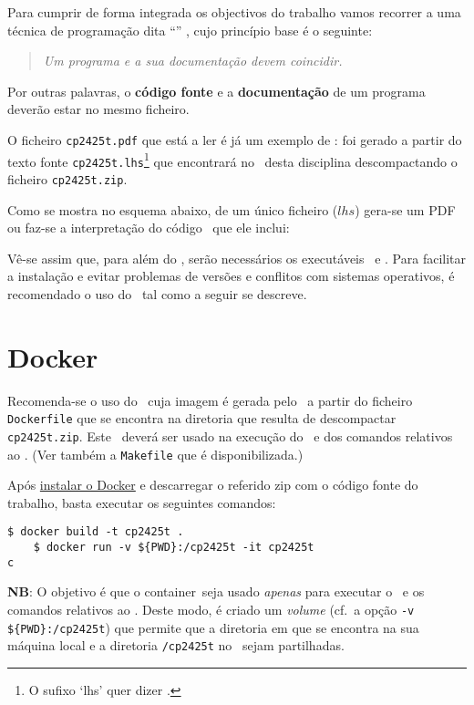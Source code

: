 \documentclass[11pt, a4paper, fleqn]{article}
\newcommand{\Varid}[1]{\mathit{#1}}
\begin{document}
Para cumprir de forma integrada os objectivos do trabalho vamos recorrer
a uma técnica de programa\-ção dita ``'' \cite{Kn92}, cujo
princípio base é o seguinte:
%
\begin{quote}\em
	Um programa e a sua documentação devem coincidir.
\end{quote}
%
Por outras palavras, o \textbf{código fonte} e a \textbf{documentação} de um
programa deverão estar no mesmo ficheiro.

O ficheiro \texttt{cp2425t.pdf} que está a ler é já um exemplo de
: foi gerado a partir do texto fonte
\texttt{cp2425t.lhs}\footnote{O sufixo `lhs' quer dizer
\emph{}.} que encontrará no \MaterialPedagogico\
desta disciplina des\-com\-pactando o ficheiro \texttt{cp2425t.zip}.

Como se mostra no esquema abaixo, de um único ficheiro (\ensuremath{\Varid{lhs}})
gera-se um PDF ou faz-se a interpretação do código \Haskell\ que ele inclui:

	\esquema

Vê-se assim que, para além do \GHCi, serão necessários os executáveis \PdfLatex\ e
\LhsToTeX. Para facilitar a instalação e evitar problemas de versões e
conflitos com sistemas operativos, é recomendado o uso do \Docker\ tal como
a seguir se descreve.

\section{Docker} \label{sec:docker}

Recomenda-se o uso do \container\ cuja imagem é gerada pelo \Docker\ a partir do ficheiro
\texttt{Dockerfile} que se encontra na diretoria que resulta de descompactar
\texttt{cp2425t.zip}. Este \container\ deverá ser usado na execução
do \GHCi\ e dos comandos relativos ao \Latex. (Ver também a \texttt{Makefile}
que é disponibilizada.)

Após \href{https://docs.docker.com/engine/install/}{instalar o Docker} e
descarregar o referido zip com o código fonte do trabalho,
basta executar os seguintes comandos:
\begin{Verbatim}[fontsize=\small]
    $ docker build -t cp2425t .
    $ docker run -v ${PWD}:/cp2425t -it cp2425t
c\end{Verbatim}
\textbf{NB}: O objetivo é que o container\ seja usado \emph{apenas} 
para executar o \GHCi\ e os comandos relativos ao \Latex.
Deste modo, é criado um \textit{volume} (cf.\ a opção \texttt{-v \$\{PWD\}:/cp2425t}) 
que permite que a diretoria em que se encontra na sua máquina local 
e a diretoria \texttt{/cp2425t} no \container\ sejam partilhadas.
\end{document}

